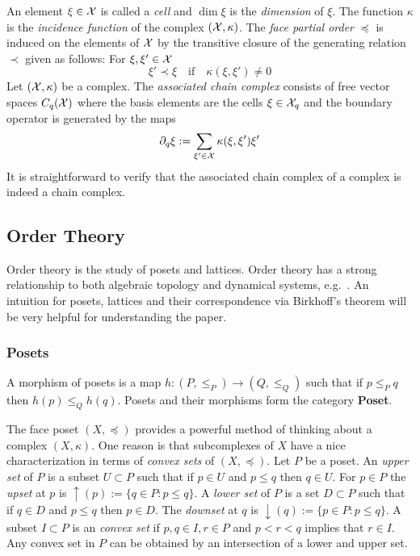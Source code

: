 An element $\xi\in {\mathcal X}$ is called a {\em cell} and $\dim \xi$ is the {\em dimension} of $\xi$.  The function $\kappa$ is the {\em incidence function} of the complex $({\mathcal X},\kappa)$.   The {\em face partial order} $\preceq$ is induced on the elements of ${\mathcal X}$ by the transitive closure of the generating relation $\prec$ given as follows: For $\xi, \xi'\in {\mathcal X}$ $$\xi' \prec \xi \quad \text{if} \quad \kappa(\xi,\xi')\neq 0$$
Let $({\mathcal X},\kappa)$ be a complex.  The {\em associated chain complex} consists of free vector spaces $C_q({\mathcal X})$ where the basis elements are the cells $\xi \in {\mathcal X}_q$ and the boundary operator is generated by the maps $$\partial_q \xi := \sum_{\xi' \in {\mathcal X}} \kappa(\xi, \xi')\xi'$$ It is straightforward to verify that the associated chain complex of a complex is indeed a chain complex.











\subsection{Order Theory}\label{sec:prelims:order}

Order theory is the study of posets and lattices.  Order theory has a strong relationship to both algebraic topology and dynamical systems, e.g.~\cite{salamon,lsa,lsa2}.  An intuition for posets, lattices and their correspondence via Birkhoff's theorem will be very helpful for understanding the paper.


\subsubsection{Posets}

A morphism of posets is a map $h:(P,\leq_P)\to (Q,\leq_Q)$ such that if $p\leq_P q$ then $h(p)\leq_Q h(q)$. Posets and their morphisms form the category {\bf Poset}.

The face poset $(X,\preceq)$ provides a powerful method of thinking about a complex $(X,\kappa)$.  One reason is that subcomplexes of $X$ have a nice characterization in terms of {\em convex sets} of $(X,\preceq)$.   Let $P$ be a poset.  An {\em upper set} of $P$ is a subset $U\subset P$ such that if $p\in U$ and $p\leq q$ then $q\in U$.  For $p\in P$ the {\em upset} at $p$ is $\uparrow(p):=\{q\in P:p \leq q\}$.  A {\em lower set} of $P$ is a set $D\subset P$ such that if $q\in D$ and $p\leq q$ then $p\in D$.  The {\em downset} at $q$ is $\downarrow(q):=\{p\in P: p \leq q\}$.  A subset $I\subset P$ is an {\em convex set} if $p,q\in I, r\in P$ and $ p < r < q$ implies that $r\in I$.  Any convex set in $P$ can be obtained by an intersection of a lower and upper set.  
 
